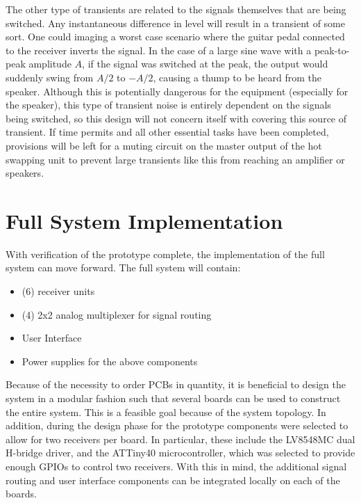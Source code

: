 \documentclass{article}
\begin{document}
	The other type of transients are related to the signals themselves that are being switched.  Any instantaneous difference in level will result in a transient of some sort.  One could imaging a worst case scenario where the guitar pedal connected to the receiver inverts the signal.  In the case of a large sine wave with a peak-to-peak amplitude $A$, if the signal was switched at the peak, the output would suddenly swing from $A/2$ to $-A/2$, causing a thump to be heard from the speaker.  Although this is potentially dangerous for the equipment (especially for the speaker), this type of transient noise is entirely dependent on the signals being switched, so this design will not concern itself with covering this source of transient.  If time permits and all other essential tasks have been completed, provisions will be left for a muting circuit on the master output of the hot swapping unit to prevent large transients like this from reaching an amplifier or speakers.




\section{Full System Implementation}
	With verification of the prototype complete, the implementation of the full system can move forward.  The full system will contain:

	\begin{itemize}
		\item (6) receiver units
		\item (4) 2x2 analog multiplexer for signal routing
		\item User Interface
		\item Power supplies for the above components
	\end{itemize}

	Because of the necessity to order PCBs in quantity, it is beneficial to design the system in a modular fashion such that several boards can be used to construct the entire system.  This is a feasible goal because of the system topology.  In addition, during the design phase for the prototype components were selected to allow for two receivers per board.  In particular, these include the LV8548MC dual H-bridge driver, and the ATTiny40 microcontroller, which was selected to provide enough GPIOs to control two receivers.  With this in mind, the additional signal routing and user interface components can be integrated locally on each of the boards.
\end{document}
